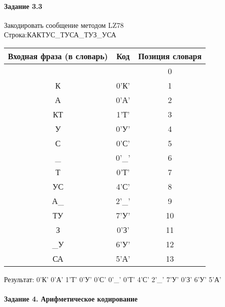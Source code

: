 \documentclass[a4paper, 12pt]{article}
\begin{document}
\paragraph{Задание 3.3}

Закодировать сообщение методом LZ78\\
Строка:КАКТУС\_ТУСА\_ТУЗ\_УСА\\
\begin{table}[h!]
\centering
\begin{tabular}{|c|c|c|} 
\hline
 Входная фраза (в словарь) & Код & Позиция словаря \\ \hline

 &  & 0 \\ \hline
К & 0'К' & 1 \\ \hline
А & 0'А' & 2 \\ \hline
КТ & 1'Т' & 3 \\ \hline
У & 0'У' & 4 \\ \hline
С & 0'С' & 5 \\ \hline
\_ & 0'\_' & 6 \\ \hline
Т & 0'Т' & 7 \\ \hline
УС & 4'С' & 8 \\ \hline
А\_ & 2'\_' & 9 \\ \hline
ТУ & 7'У' & 10 \\ \hline
З & 0'З' & 11 \\ \hline
\_У & 6'У' & 12 \\ \hline
СА & 5'А' & 13 \\ \hline
\end{tabular}
\end{table}

Результат: 0'К' 0'А' 1'Т' 0'У' 0'С' 0'\_' 0'Т' 4'С' 2'\_' 7'У' 0'З' 6'У' 5'А'\\
\pagebreak
\paragraph{Задание 4. Арифметическое кодирование\\}
\end{document}
